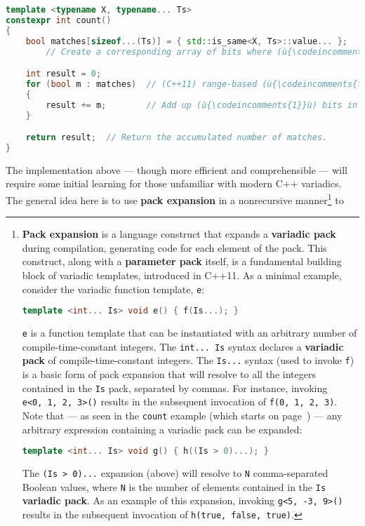 \begin{lstlisting}[language=C++]
template <typename X, typename... Ts>
constexpr int count()
{
    bool matches[sizeof...(Ts)] = { std::is_same<X, Ts>::value... };
        // Create a corresponding array of bits where (ù{\codeincomments{1}}ù) indicates sameness.

    int result = 0;
    for (bool m : matches)  // (C++11) range-based (ù{\codeincomments{for}}ù) loop
    {
        result += m;        // Add up (ù{\codeincomments{1}}ù) bits in the array.
    }

    return result;  // Return the accumulated number of matches.
}
\end{lstlisting}
    
\noindent The implementation above --- though more efficient and comprehensible
--- will require some initial learning for those unfamiliar with modern
C++ variadics. The general idea here is to use \textbf{pack expansion}
in a nonrecursive manner{\cprotect\footnote{\textbf{Pack expansion} is
a language construct that expands a \textbf{variadic pack} during
compilation, generating code for each element of the pack. This
construct, along with a \textbf{parameter pack} itself, is a
  fundamental building block of variadic templates,
  introduced in C++11. As a minimal example, consider the variadic
  function template, \texttt{e}:

  \begin{lstlisting}[language=C++, basicstyle={\ttfamily\footnotesize}]
  template <int... Is> void e() { f(Is...); }
  \end{lstlisting}
      
\noindent \texttt{e} is a function template that can be instantiated
  with an arbitrary number of compile-time-constant integers. The
  \texttt{int...}~\texttt{Is} syntax declares a \textbf{variadic pack}
  of compile-time-constant integers. The \texttt{Is...} syntax (used to
  invoke \texttt{f}) is a basic form of pack expansion that will resolve
  to all the integers contained in the \texttt{Is} pack, separated by
  commas. For instance, invoking
  \texttt{e<0,}~\texttt{1,}~\texttt{2,}~\texttt{3>()} results in the
  subsequent invocation of
  \texttt{f(0,}~\texttt{1,}~\texttt{2,}~\texttt{3)}. Note that --- as
  seen in the \texttt{count} example (which starts on page~\pageref{relaxedconstexpr-countcode}) --- any arbitrary
  expression containing a variadic pack can be expanded:

  \begin{lstlisting}[language=C++, basicstyle={\ttfamily\footnotesize}]
  template <int... Is> void g() { h((Is > 0)...); }
  \end{lstlisting}
      
\noindent The \texttt{(Is}~\texttt{>}~\texttt{0)...} expansion (above) will
  resolve to \texttt{N} comma-separated Boolean values, where \texttt{N}
  is the number of elements contained in the \texttt{Is}
  \textbf{variadic pack}. As an example of this expansion, invoking
  \texttt{g<5,}~\texttt{-3,}~\texttt{9>()} results in the subsequent invocation of \texttt{h(true,}~\texttt{false,}~\texttt{true)}.}} to
